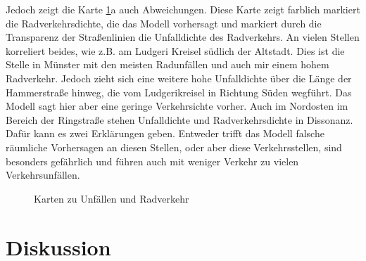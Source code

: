 \documentclass[a4paper,12pt]{thesis}
\begin{document}
Jedoch zeigt die Karte \ref{fig:Unfallkarten}a auch Abweichungen. Diese Karte zeigt farblich markiert die Radverkehrsdichte, die das Modell vorhersagt und markiert durch die Transparenz der Straßenlinien die Unfalldichte des Radverkehrs. An vielen Stellen korreliert beides, wie z.B. am Ludgeri Kreisel südlich der Altstadt. Dies ist die Stelle in Münster mit den meisten Radunfällen und auch mir einem hohem Radverkehr. Jedoch zieht sich eine weitere hohe Unfalldichte über die Länge der Hammerstraße hinweg, die vom Ludgerikreisel in Richtung Süden wegführt. Das Modell sagt hier aber eine geringe Verkehrsichte vorher. Auch im Nordosten im Bereich der Ringstraße stehen Unfalldichte und Radverkehrsdichte in Dissonanz. Dafür kann es zwei Erklärungen geben. Entweder trifft das Modell falsche räumliche Vorhersagen an diesen Stellen, oder aber diese Verkehrsstellen, sind besonders gefährlich und führen auch mit weniger Verkehr zu vielen Verkehrsunfällen.

\begin{figure}%
	\centering
	
	\caption{Karten zu Unfällen und Radverkehr}%
	\label{fig:Unfallkarten}%
\end{figure}

\chapter{Diskussion}
\end{document}
